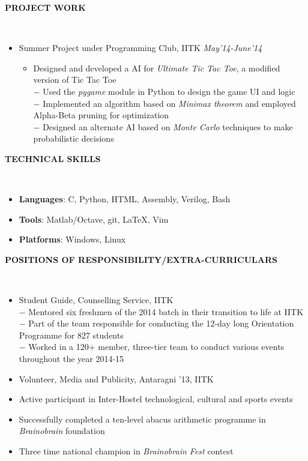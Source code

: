 \documentclass[a4paper,10pt]{article}
\newcommand{\isep}{-2 pt}
\newcommand{\lsep}{-0.5cm}
\newcommand{\resheading}[1]{{\small \colorbox{mygrey}{\begin{minipage}{0.975\textwidth}{\textbf{#1 \vphantom{p\^{E}}}}\end{minipage}}}}
\begin{document}
\resheading{\textbf{PROJECT WORK} }\\[\lsep]
\begin{itemize}
\item\noindent Summer Project under Programming Club, IITK \hfill\emph{May'14-June'14}
\vspace{-2mm}
\begin{itemize}\itemsep \isep
\item \noindent Designed and developed a AI for \emph{Ultimate Tic Tac Toe}, a modified version of Tic Tac Toe\\
$-$ Used the \emph{pygame} module in Python to design the game UI and logic\\
$-$ Implemented an algorithm based on \emph{Minimax theorem} and employed Alpha-Beta pruning for optimization\\
$-$ Designed an alternate AI based on \emph{Monte Carlo} techniques to make probabilistic decisions\\
\end{itemize}
\end{itemize}

\resheading{\textbf{TECHNICAL SKILLS} }\\[\lsep]
\begin{itemize}\itemsep\isep
\item \noindent \textbf{Languages}: C, Python, HTML, Assembly, Verilog, Bash
\item \noindent \textbf{Tools}: Matlab/Octave, git, \LaTeX, Vim
\item \noindent \textbf{Platforms}: Windows, Linux
\end{itemize}

\resheading{\textbf{POSITIONS OF RESPONSIBILITY/EXTRA-CURRICULARS} }\\[\lsep]
\begin{itemize}\itemsep \isep
\item \noindent Student Guide, Counselling Service, IITK\\
$-$ Mentored six freshmen of the 2014 batch in their transition to life at IITK\\
$-$ Part of the team responsible for conducting the 12-day long Orientation Programme for 827 students\\
$-$ Worked in a 120+ member, three-tier team to conduct various events throughout the year 2014-15
\item \noindent Volunteer, Media and Publicity, Antaragni '13, IITK
\item \noindent Active participant in Inter-Hostel technological, cultural and sports events
\item \noindent Successfully completed a ten-level abacus arithmetic programme in \emph{Brainobrain} foundation
\item \noindent Three time national champion in \emph{Brainobrain Fest} contest
\end{itemize}
\end{document}
